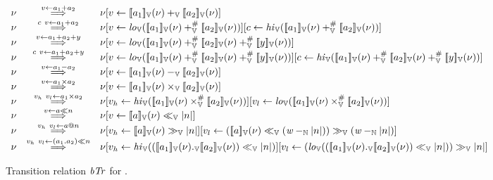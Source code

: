 \begin{figure*}
$
\begin{array}{rcl}
\bvst & \goesto{v \leftarrow a_1 + a_2} & \bvst[v \leftarrow \bvvalueof{a_1}(\bvst) +_\bvop \bvvalueof{a_2}(\bvst)] \\
\bvst & \goesto{c\ v \leftarrow a_1 + a_2} & \bvst[v \leftarrow \lo_\bvop(\bvvalueof{a_1}(\bvst) +_\bvop^\# \bvvalueof{a_2}(\bvst))][c \leftarrow \hi_\bvop(\bvvalueof{a_1}(\bvst) +_\bvop^\# \bvvalueof{a_2}(\bvst))] \\
\bvst & \goesto{v \leftarrow a_1 + a_2 + y} & \bvst[v \leftarrow \lo_\bvop(\bvvalueof{a_1}(\bvst) +_\bvop^\# \bvvalueof{a_2}(\bvst) +_\bvop^\# \bvvalueof{y}(\bvst))] \\
\bvst & \goesto{c\ v \leftarrow a_1 + a_2 + y} & \bvst[v \leftarrow \lo_\bvop(\bvvalueof{a_1}(\bvst) +_\bvop^\# \bvvalueof{a_2}(\bvst) +_\bvop^\# \bvvalueof{y}(\bvst))][c \leftarrow \hi_\bvop(\bvvalueof{a_1}(\bvst) +_\bvop^\# \bvvalueof{a_2}(\bvst) +_\bvop^\# \bvvalueof{y}(\bvst))] \\
\bvst & \goesto{v \leftarrow a_1 - a_2} & \bvst[v \leftarrow \bvvalueof{a_1}(\bvst) -_\bvop \bvvalueof{a_2}(\bvst)] \\
\bvst & \goesto{v \leftarrow a_1 \times a_2} & \bvst[v \leftarrow \bvvalueof{a_1}(\bvst) \times_\bvop \bvvalueof{a_2}(\bvst)] \\
\bvst & \goesto{v_h\ v_l \leftarrow a_1 \times a_2} & \bvst[v_h \leftarrow \hi_\bvop(\bvvalueof{a_1}(\bvst) \times_\bvop^\# \bvvalueof{a_2}(\bvst))][v_l \leftarrow \lo_\bvop(\bvvalueof{a_1}(\bvst) \times_\bvop^\# \bvvalueof{a_2}(\bvst))] \\
\bvst & \goesto{v \leftarrow a \ll n} & \bvst[v \leftarrow \bvvalueof{a}(\bvst) \ll_\bvop \unsigned{n}] \\
\bvst & \goesto{v_h\ v_l \leftarrow a @ n} & \bvst[v_h \leftarrow \bvvalueof{a}(\bvst) \gg_\bvop \unsigned{n}][v_l \leftarrow (\bvvalueof{a}(\bvst) \ll_\bvop (\wordsize -_{\bbfN} \unsigned{n})) \gg_\bvop (\wordsize -_{\bbfN} \unsigned{n})] \\
\bvst & \goesto{v_h\ v_l \leftarrow (a_1 . a_2) \ll n} & \bvst[v_h \leftarrow \hi_\bvop((\bvvalueof{a_1}(\bvst) ._\bvop \bvvalueof{a_2}(\bvst)) \ll_\bvop \unsigned{n})][v_l \leftarrow (\lo_\bvop((\bvvalueof{a_1}(\bvst) ._\bvop \bvvalueof{a_2}(\bvst)) \ll_\bvop \unsigned{n})) \gg_\bvop \unsigned{n}] \\
\end{array}
$
\caption{Transition relation $\mathit{bTr}$ for \bvdsl. \label{fig:semantic-function-bvdsl}}
\end{figure*}

